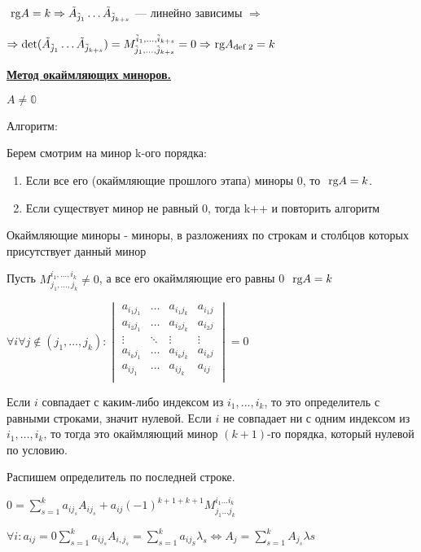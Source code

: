 \(\rg A = k \Rightarrow \tilde A_{\tilde j_1} \ldots \tilde A_{\tilde j_{k + s}}\) --- линейно зависимы \(\Rightarrow\)

\(\Rightarrow  \det(\tilde A_{\tilde j_1} \ldots \tilde A_{\tilde j_{k + s}}) = M_{\tilde j_1, \ldots, \tilde j_{k + s}}^{\tilde i_1, \ldots, \tilde i_{k + s}} = 0 \Rightarrow \rg A_{\text{def 2}} = k\)

\uline{\textbf{Метод окаймляющих миноров.}}

\(A \neq \mathbb{0}\)

Алгоритм:

Берем смотрим на минор k-ого порядка:
\begin{enumerate}
    \item Если все его (окаймляющие прошлого этапа) миноры 0, то \(\rg A = k\).
    \item Если существует минор не равный 0, тогда k++ и повторить алгоритм 
\end{enumerate}

Окаймляющие миноры - миноры, в разложениях по строкам и столбцов которых присутствует данный минор

Пусть \(M_{j_1, \ldots, j_k}^{i_1, \ldots, i_k} \neq 0\), а все его окаймляющие его равны 0 \(\rg A = k\)

\(\forall i \forall j \notin(j_1, 
\ldots, j_k): 
\begin{vmatrix}
a_{i_1 j_1} & \ldots & a_{i_1 j_k} & a_{i_1 j} \\
a_{i_2 j_1} & \ldots & a_{i_2 j_k} & a_{i_2 j} \\
\vdots & \ddots & \vdots & \vdots \\
a_{i_k j_1} & \ldots & a_{i_k j_k} & a_{i_k j} \\
a_{i j_1} & \ldots & a_{i j_k} & a_{i j} \\
\end{vmatrix} = 0\) 

Если \(i\) совпадает с каким-либо индексом из \(i_1, \ldots, i_k\), то это определитель с равными строками, значит нулевой. Если \(i\) не совпадает ни с одним индексом из \(i_1, \ldots, i_k\), то тогда это окаймляющий минор \((k + 1)\)-го порядка, который нулевой по условию.

Распишем определитель по последней строке.

\( 0  = \sum\limits_{s=1}^{k} a_{i j_s} A_{ij_s} + a_{ij} (-1)^{k+1+k+1} M_{j_1\ldots j_k}^{i_1 \ldots i_k}\)

\(\forall i : a_{ij} =  0 \sum\limits_{s=1}^k a_{i j_s} A_{i,j_s} = \sum\limits_{s=1}^{k}a_{ij_S} \lambda_s \Leftrightarrow A_j = \sum\limits_{s=1}^{k}  A_{j_s} \lambda s\)

